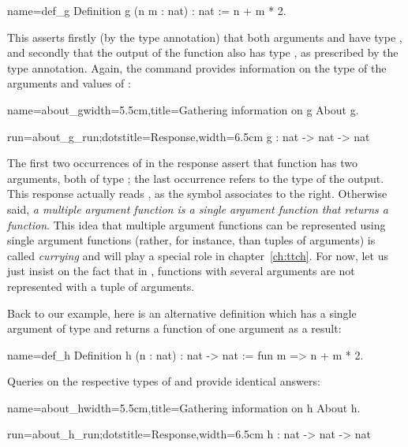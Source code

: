 \begin{coq}{name=def_g}{}
Definition g (n m : nat) : nat := n + m * 2.
\end{coq}
This asserts firstly
(by the  type annotation)
that both arguments  and  have type ,
and secondly that the
output of the function also has type , as prescribed by the
 type annotation. Again, the   command
provides information on the type of the arguments and values of
:

\begin{coq-left}{name=about_g}{width=5.5cm,title=Gathering information on g}
About g.
\end{coq-left}
\begin{coqout-right}{run=about_g_run;dots}{title=Response,width=6.5cm}
g : nat -> nat -> nat
\end{coqout-right}

The first two occurrences of  in the response
  assert that function  has two arguments,
 both of type ; the last occurrence refers to the type of
 the output. This response actually reads ,
 as the \C{->} symbol associates to the right. Otherwise said,
 {\em a multiple
 argument function is a single argument function that returns a
 function}.  This idea that multiple argument functions can be
represented using single argument functions (rather, for instance, than
tuples of arguments) is called {\em currying} and will play a special
role in chapter~\ref{ch:ttch}. For now, let us just insist on the fact
that in \Coq{}, functions with several arguments are not represented
with a tuple of arguments.


Back to our example, here is an alternative definition
  which has a single argument  of type  and returns
 a function of one argument as a result:

\begin{coq}{name=def_h}{}
Definition h (n : nat) : nat -> nat := fun m => n + m * 2.
\end{coq}

Queries on the respective types of  and  provide identical answers:

\begin{coq-left}{name=about_h}{width=5.5cm,title=Gathering information on h}
About h.
\end{coq-left}
\begin{coqout-right}{run=about_h_run;dots}{title=Response,width=6.5cm}
h : nat -> nat -> nat
\end{coqout-right}

